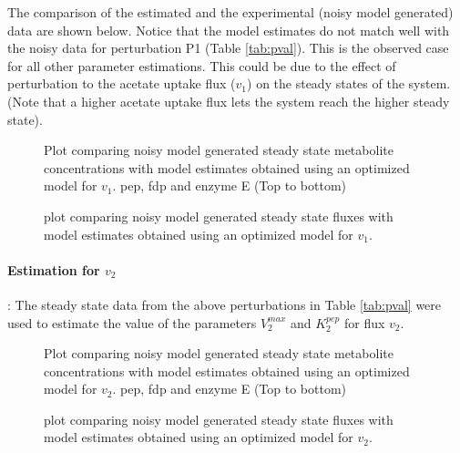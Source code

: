 \documentclass[10pt]{report}
\begin{document}
	The comparison of the estimated and the experimental (noisy model generated) data are shown below. Notice that the model estimates do not match well with the noisy data for perturbation P1 (Table \ref{tab:pval}). This is the observed case for all other parameter estimations. This could be due to the effect of perturbation to the acetate uptake flux ($v_1$) on the steady states of the system. (Note that a higher acetate uptake flux lets the system reach the higher steady state).
	
	\begin{figure}[!tbhp]
		\caption{Plot comparing noisy model generated steady state metabolite concentrations with model estimates obtained using an optimized model for $v_1$. pep, fdp and enzyme E (Top to bottom)}
	\end{figure}
	\begin{figure}[!tbhp]
		\caption{plot comparing noisy model generated steady state fluxes with model estimates obtained using an optimized model for $v_1$.}
	\end{figure}
	\clearpage

	\paragraph{Estimation for $v_2$}: The steady state data from the above perturbations in Table \ref{tab:pval} were used to estimate the value of the parameters $V_2^{max}$ and $K_2^{pep}$ for flux $v_2$.
		
	\begin{figure}[!tbhp]
		\caption{Plot comparing noisy model generated steady state metabolite concentrations with model estimates obtained using an optimized model for $v_2$. pep, fdp and enzyme E (Top to bottom)}
	\end{figure}
	\begin{figure}[!tbhp]
		\caption{plot comparing noisy model generated steady state fluxes with model estimates obtained using an optimized model for $v_2$.}
	\end{figure}
\end{document}
